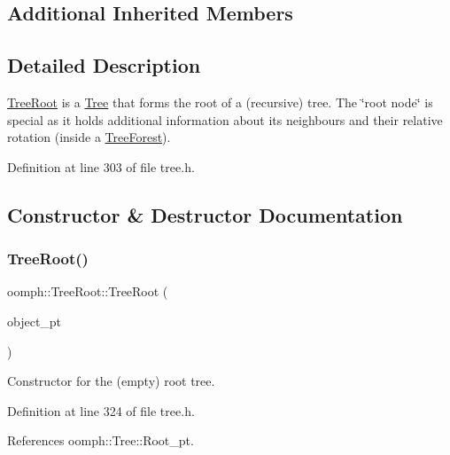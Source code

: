 \subsection*{Additional Inherited Members}


\subsection{Detailed Description}
\hyperlink{classoomph_1_1TreeRoot}{Tree\+Root} is a \hyperlink{classoomph_1_1Tree}{Tree} that forms the root of a (recursive) tree. The \char`\"{}root node\char`\"{} is special as it holds additional information about its neighbours and their relative rotation (inside a \hyperlink{classoomph_1_1TreeForest}{Tree\+Forest}). 

Definition at line 303 of file tree.\+h.



\subsection{Constructor \& Destructor Documentation}
\mbox{\label{classoomph_1_1TreeRoot_a9220f966655424676f4a5710b016c23d}} 
\subsubsection{\texorpdfstring{Tree\+Root()}{TreeRoot()}\hspace{0.1cm}{\footnotesize\ttfamily [1/2]}}
{\footnotesize\ttfamily oomph\+::\+Tree\+Root\+::\+Tree\+Root (\begin{DoxyParamCaption}\item[{\hyperlink{classoomph_1_1RefineableElement}{Refineable\+Element} $\ast$const \&}]{object\+\_\+pt }\end{DoxyParamCaption})\hspace{0.3cm}{\ttfamily [inline]}}



Constructor for the (empty) root tree. 



Definition at line 324 of file tree.\+h.



References oomph\+::\+Tree\+::\+Root\+\_\+pt.

\mbox{\label{classoomph_1_1TreeRoot_abadadc75e4d5b3398306579bb1eb76a7}} 
